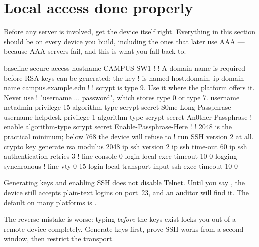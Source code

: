 \section{Local access done properly}

Before any server is involved, get the device itself right. Everything in this
section should be on every device you build, including the ones that later use
AAA --- because AAA servers fail, and this is what you fall back to.

\begin{config}{baseline secure access}
hostname CAMPUS-SW1
!
! A domain name is required before RSA keys can be generated: the key
! is named host.domain.
ip domain name campus.example.edu
!
! scrypt is type 9. Use it where the platform offers it. Never use
! "username ... password", which stores type 0 or type 7.
username netadmin privilege 15 algorithm-type scrypt secret S0me-Long-Passphrase
username helpdesk privilege 1  algorithm-type scrypt secret An0ther-Passphrase
!
enable algorithm-type scrypt secret Enable-Passphrase-Here
!
! 2048 is the practical minimum; below 768 the device will refuse to
! run SSH version 2 at all.
crypto key generate rsa modulus 2048
ip ssh version 2
ip ssh time-out 60
ip ssh authentication-retries 3
!
line console 0
 login local
 exec-timeout 10 0
 logging synchronous
!
line vty 0 15
 login local
 transport input ssh
 exec-timeout 10 0
\end{config}

\begin{alertbox}
Generating keys and enabling SSH does not disable Telnet. Until you say
, the device still accepts plain-text logins on port~23,
and an auditor will find it. The default on many platforms is
.

The reverse mistake is worse: typing  \emph{before} the
keys exist locks you out of a remote device completely. Generate keys first,
prove SSH works from a second window, then restrict the transport.
\end{alertbox}

